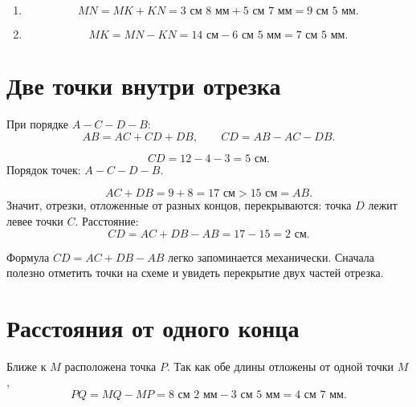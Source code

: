 \begin{practicebox}
  \begin{enumerate}[label=\alph*),itemsep=0.5em]
    \item
      \[
        MN=MK+KN=3\text{ см }8\text{ мм}+5\text{ см }7\text{ мм}
          =9\text{ см }5\text{ мм}.
      \]
    \item
      \[
        MK=MN-KN=14\text{ см}-6\text{ см }5\text{ мм}
          =7\text{ см }5\text{ мм}.
      \]
  \end{enumerate}
\end{practicebox}

\section{Две точки внутри отрезка}

\fourpointsfigure

\begin{propertybox}[Ответ]
  При порядке \(A-C-D-B\):
  \[
    AB=AC+CD+DB,\qquad CD=AB-AC-DB.
  \]
\end{propertybox}

\begin{practicebox}
  \[
    CD=12-4-3=5\text{ см}.
  \]
  Порядок точек: \(A-C-D-B\).
\end{practicebox}

\begin{thinkbox}
  \[
    AC+DB=9+8=17\text{ см}>15\text{ см}=AB.
  \]
  Значит, отрезки, отложенные от разных концов, перекрываются: точка \(D\)
  лежит левее точки \(C\). Расстояние:
  \[
    CD=AC+DB-AB=17-15=2\text{ см}.
  \]
\end{thinkbox}

\begin{teacherbox}
  Формула \(CD=AC+DB-AB\) легко запоминается механически. Сначала полезно
  отметить точки на схеме и увидеть перекрытие двух частей отрезка.
\end{teacherbox}

\section{Расстояния от одного конца}

\sameendpointfigure

\begin{practicebox}
  Ближе к \(M\) расположена точка \(P\). Так как обе длины отложены от
  одной точки \(M\),
  \[
    PQ=MQ-MP=8\text{ см }2\text{ мм}-3\text{ см }5\text{ мм}
      =4\text{ см }7\text{ мм}.
  \]
\end{practicebox}

